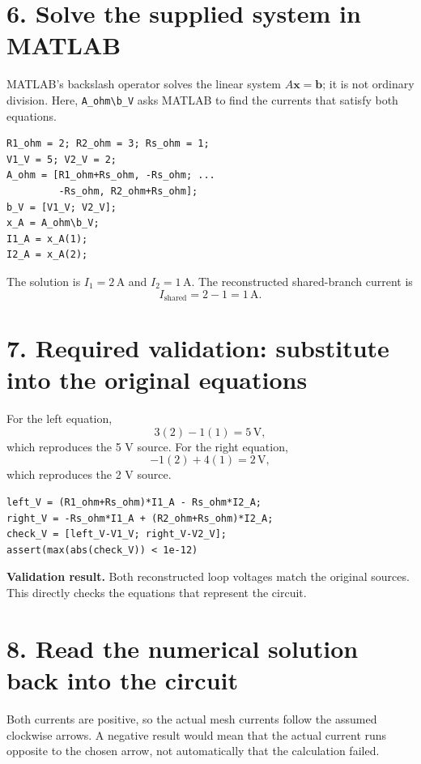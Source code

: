 \documentclass[11pt,a4paper]{article}
\newcommand{\units}[1]{\,\mathrm{#1}}
\begin{document}
\section*{6. Solve the supplied system in MATLAB}
MATLAB's backslash operator solves the linear system $A\mathbf{x}=\mathbf{b}$; it is not ordinary division. Here, \texttt{A\_ohm\textbackslash b\_V} asks MATLAB to find the currents that satisfy both equations.
\begin{lstlisting}[style=matlabstyle,caption={Assemble the two-loop Kirchhoff system and solve for the mesh currents.}]
R1_ohm = 2; R2_ohm = 3; Rs_ohm = 1;
V1_V = 5; V2_V = 2;
A_ohm = [R1_ohm+Rs_ohm, -Rs_ohm; ...
         -Rs_ohm, R2_ohm+Rs_ohm];
b_V = [V1_V; V2_V];
x_A = A_ohm\b_V;
I1_A = x_A(1);
I2_A = x_A(2);
\end{lstlisting}

The solution is $I_1=2\units{A}$ and $I_2=1\units{A}$. The reconstructed shared-branch current is
\[
I_{\mathrm{shared}}=2-1=1\units{A}.
\]

\section*{7. Required validation: substitute into the original equations}
For the left equation,
\[
3(2)-1(1)=5\units{V},
\]
which reproduces the 5 V source. For the right equation,
\[
-1(2)+4(1)=2\units{V},
\]
which reproduces the 2 V source.

\begin{lstlisting}[style=matlabstyle,caption={Reconstruct each loop equation and test the voltage residuals.}]
left_V = (R1_ohm+Rs_ohm)*I1_A - Rs_ohm*I2_A;
right_V = -Rs_ohm*I1_A + (R2_ohm+Rs_ohm)*I2_A;
check_V = [left_V-V1_V; right_V-V2_V];
assert(max(abs(check_V)) < 1e-12)
\end{lstlisting}

\begin{checkbox}\textbf{Validation result.} Both reconstructed loop voltages match the original sources. This directly checks the equations that represent the circuit.\end{checkbox}

\section*{8. Read the numerical solution back into the circuit}
Both currents are positive, so the actual mesh currents follow the assumed clockwise arrows. A negative result would mean that the actual current runs opposite to the chosen arrow, not automatically that the calculation failed.
\end{document}
